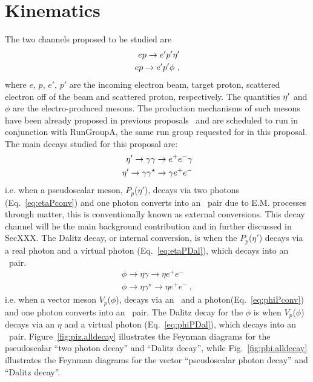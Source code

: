\section{Kinematics}\label{sec:kinematics}
The two channels proposed to be studied are 
\begin{align}
ep\to e'p' \eta^{\prime}  \label{eq:etaP} \\
ep\to e'p' \phi   \label{eq:phiP} \ ,
\end{align}
where $e$, $p$, $e'$, $p'$ are the incoming electron beam, target proton, scattered electron off of the beam and scattered proton, respectively. The quantities $\eta^{\prime}$ and $\phi$ are the electro-produced mesons. The production mechanisms of such mesons have been already proposed in previous proposals~\cite{clas.proposal.eta,clas.proposal.phi} and are scheduled to run in conjunction with RunGroupA, the same run group requested for in this proposal.
The main decays studied for this proposal are:
\begin{align}
\eta^{\prime} \rightarrow \gamma \gamma \to e^+e^- \gamma \label{eq:etaPconv} \\
\eta^{\prime} \rightarrow \gamma \gamma^\star \to \gamma e^+e^- \label{eq:etaPDal} 
\end{align}
i.e. when a pseudoscalar meson, $P_p$($\eta'$), decays via two photons (Eq.~\ref{eq:etaPconv}) and one photon converts into an \epemT \ pair due to E.M. processes through matter, this is conventionally known as external conversions. This decay channel will he the main background contribution and in further discussed in SecXXX. The Dalitz decay, or internal conversion, is when the $P_p$($\eta'$) decays via a real photon and a virtual photon (Eq.~\ref{eq:etaPDal}), which decays into an \epemT \ pair.
\begin{align}
\phi \rightarrow  \eta \gamma \to \eta e^+e^- \label{eq:phiPconv} \\
\phi \rightarrow \eta  \gamma^\star \to \eta  e^+e^-\label{eq:phiPDal} \ ,
\end{align}
i.e. when a vector meson $V_p$($\phi$), decays via an \etaT \ and a photon(Eq.~\ref{eq:phiPconv}) and one photon converts into an \epemT \ pair. The Dalitz decay for the $\phi$ is when $V_p$($\phi$) decays via an $\eta$ and a virtual photon (Eq.~\ref{eq:phiPDal}), which decays into an \epemT \ pair.
Figure~\ref{fig:piz.alldecay} illustrates the Feynman diagrams for the pseudoscalar ``two photon decay'' and  ``Dalitz decay'', while Fig.~\ref{fig:phi.alldecay} illustrates the Feynman diagrams for the vector ``pseudoscalar photon decay'' and  ``Dalitz decay''.
